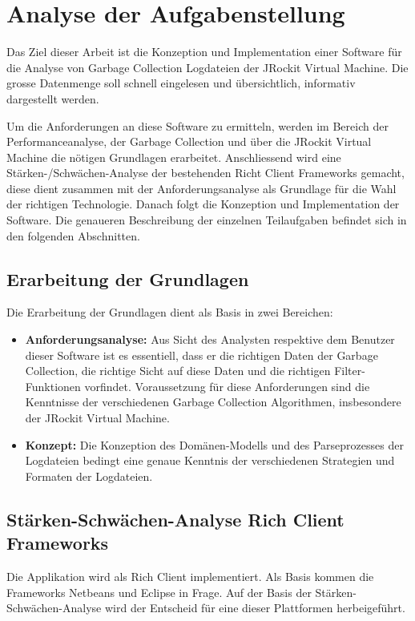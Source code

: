 \chapter{Analyse der Aufgabenstellung}\label{analyse_aufgabenstellung}
Das Ziel dieser Arbeit ist die Konzeption und Implementation einer Software für die Analyse von Garbage Collection Logdateien der JRockit Virtual Machine. Die grosse Datenmenge soll schnell eingelesen und übersichtlich, informativ dargestellt werden. 

Um die Anforderungen an diese Software zu ermitteln, werden im Bereich der Performanceanalyse, der Garbage Collection und über die JRockit Virtual Machine die nötigen Grundlagen erarbeitet. Anschliessend wird eine Stärken-/Schwächen-Analyse der bestehenden Richt Client Frameworks gemacht, diese dient zusammen mit der Anforderungsanalyse als Grundlage für die Wahl der richtigen Technologie. Danach folgt die Konzeption und Implementation der Software. Die genaueren Beschreibung der einzelnen Teilaufgaben befindet sich in den folgenden Abschnitten.

\section{Erarbeitung der Grundlagen}
Die Erarbeitung der Grundlagen dient als Basis in zwei Bereichen:
\begin{itemize}
	\item \textbf{Anforderungsanalyse:} Aus Sicht des Analysten respektive dem Benutzer dieser Software ist es essentiell, dass er die richtigen Daten der Garbage Collection, die richtige Sicht auf diese Daten und die richtigen Filter-Funktionen vorfindet. Voraussetzung für diese Anforderungen sind die Kenntnisse der verschiedenen Garbage Collection Algorithmen, insbesondere der JRockit Virtual Machine. 
	\item \textbf{Konzept: } Die Konzeption des Domänen-Modells und des Parseprozesses der Logdateien bedingt eine genaue Kenntnis der verschiedenen Strategien und Formaten der Logdateien.
\end{itemize}

\section{Stärken-Schwächen-Analyse Rich Client Frameworks}
Die Applikation wird als Rich Client implementiert. Als Basis kommen die Frameworks Netbeans und Eclipse in Frage. Auf der Basis der Stärken-Schwächen-Analyse wird der Entscheid für eine dieser Plattformen herbeigeführt.

